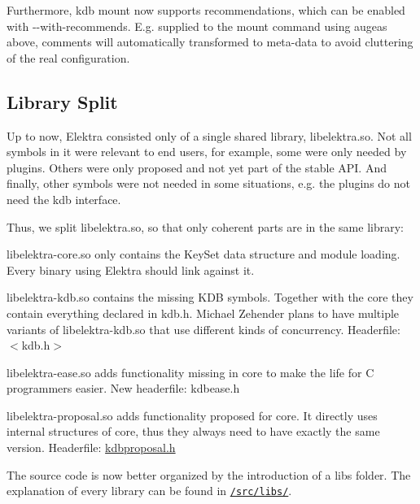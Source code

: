 Furthermore, {\ttfamily kdb mount} now supports recommendations, which can be enabled with {\ttfamily -\/-\/with-\/recommends}. E.\+g. supplied to the mount command using augeas above, comments will automatically transformed to meta-\/data to avoid cluttering of the real configuration.

\subsection*{Library Split}

Up to now, Elektra consisted only of a single shared library, {\ttfamily libelektra.\+so}. Not all symbols in it were relevant to end users, for example, some were only needed by plugins. Others were only proposed and not yet part of the stable A\+P\+I. And finally, other symbols were not needed in some situations, e.\+g. the plugins do not need the {\ttfamily kdb} interface.

Thus, we split {\ttfamily libelektra.\+so}, so that only coherent parts are in the same library\+:


\begin{DoxyItemize}
\item {\ttfamily libelektra-\/core.\+so} only contains the {\ttfamily Key\+Set} data structure and module loading. Every binary using Elektra should link against it.
\item {\ttfamily libelektra-\/kdb.\+so} contains the missing {\ttfamily K\+D\+B} symbols. Together with the {\ttfamily core} they contain everything declared in {\ttfamily kdb.\+h}. Michael Zehender plans to have multiple variants of {\ttfamily libelektra-\/kdb.\+so} that use different kinds of concurrency. Headerfile\+: {\ttfamily $<$kdb.\+h$>$}
\item {\ttfamily libelektra-\/ease.\+so} adds functionality missing in {\ttfamily core} to make the life for C programmers easier. New headerfile\+: {\ttfamily kdbease.\+h}
\item {\ttfamily libelektra-\/proposal.\+so} adds functionality proposed for {\ttfamily core}. It directly uses internal structures of {\ttfamily core}, thus they always need to have exactly the same version. Headerfile\+: {\ttfamily \hyperlink{kdbproposal_8h}{kdbproposal.\+h}}
\end{DoxyItemize}

The source code is now better organized by the introduction of a {\ttfamily libs} folder. The explanation of every library can be found in \href{https://github.com/ElektraInitiative/libelektra/tree/master/src/libs}{\tt /src/libs/}.

